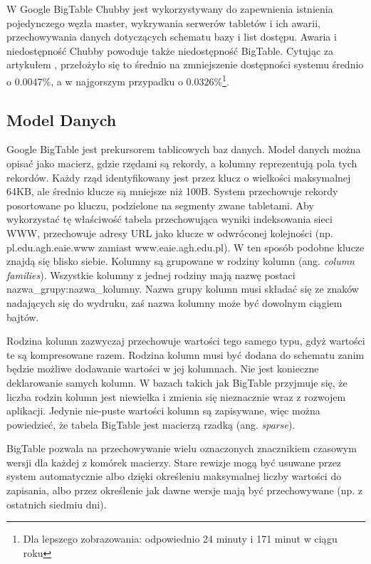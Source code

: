 W Google BigTable Chubby jest wykorzystywany do zapewnienia istnienia pojedynczego węzła master, wykrywania serwerów tabletów i ich awarii, przechowywania danych dotyczących schematu bazy i list dostępu.
Awaria i niedostępność Chubby powoduje także niedostępność BigTable.
Cytując za artykułem \cite{google-bigtable}, przełożyło się to średnio na zmniejszenie dostępności systemu średnio o 0.0047\%, a w najgorszym przypadku o 0.0326\%\footnote{Dla lepszego zobrazowania: odpowiednio 24 minuty i 171 minut w ciągu roku}.

\subsection*{Model Danych}

Google BigTable jest prekursorem tablicowych baz danych.
Model danych można opisać jako macierz, gdzie rzędami są rekordy, a kolumny reprezentują pola tych rekordów.
Każdy rząd identyfikowany jest przez klucz o wielkości maksymalnej 64KB, ale średnio klucze są mniejsze niż 100B.
System przechowuje rekordy posortowane po kluczu, podzielone na segmenty zwane tabletami.
Aby wykorzystać tę właściwość tabela przechowująca wyniki indeksowania sieci WWW, przechowuje adresy URL jako klucze w odwróconej kolejności (np. pl.edu.agh.eaie.www zamiast www.eaie.agh.edu.pl).
W ten sposób podobne klucze znajdą się blisko siebie.
Kolumny są grupowane w rodziny kolumn (ang. \emph{column families}).
Wszystkie kolumny z jednej rodziny mają nazwę postaci nazwa\_grupy:nazwa\_kolumny.
Nazwa grupy kolumn musi składać się ze znaków nadających się do wydruku, zaś nazwa kolumny może być dowolnym ciągiem bajtów.

Rodzina kolumn zazwyczaj przechowuje wartości tego samego typu, gdyż wartości te są kompresowane razem.
Rodzina kolumn musi być dodana do schematu zanim będzie możliwe dodawanie wartości w jej kolumnach.
Nie jest konieczne deklarowanie samych kolumn.
W bazach takich jak BigTable przyjmuje się, że liczba rodzin kolumn jest niewielka i zmienia się nieznacznie wraz z rozwojem aplikacji.
Jedynie nie-puste wartości kolumn są zapisywane, więc można powiedzieć, że tabela BigTable jest macierzą rzadką (ang. \emph{sparse}).

BigTable pozwala na przechowywanie wielu oznaczonych znacznikiem czasowym wersji dla każdej z komórek macierzy.
Stare rewizje mogą być usuwane przez system automatycznie albo dzięki określeniu maksymalnej liczby wartości do zapisania, albo przez określenie jak dawne wersje mają być przechowywane (np. z ostatnich siedmiu dni).

